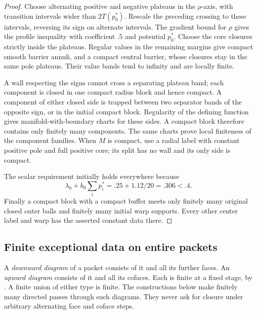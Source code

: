 \begin{proof}
Choose alternating positive and negative plateaus in the $\rho$-axis,
with transition intervals wider than $2T(p_0^*)$. Rescale the preceding
crossing to these intervals, reversing its sign on alternate intervals.
The gradient bound for $\rho$ gives the profile inequality with
coefficient $.5$ and potential $p_0^*$. Choose the core closures
strictly inside the plateaus. Regular values in the remaining margins
give compact smooth barrier annuli, and a compact central barrier,
whose closures stay in the same pole plateaus. Their value bands tend
to infinity and are locally finite.

A wall respecting the signs cannot cross a separating plateau band;
each component is closed in one compact radius block and hence compact.
A component of either closed side is trapped between two separator
bands of the opposite sign, or in the initial compact block.
Regularity of the defining function gives manifold-with-boundary
charts for these sides. A compact block therefore contains only
finitely many components. The same charts prove local finiteness of
the component families. When $M$ is compact, use a radial label with
constant positive pole and full positive core; its split has no wall
and its only side is compact.

The scalar requirement initially holds everywhere because
\[
 \lambda_0+b_0\sum_i p_i^*=.25+1.12/20=.306<.4.
\]
Finally a compact block with a compact buffer meets only finitely many
original closed outer balls and finitely many initial warp supports.
Every other center label and warp has the asserted constant data there.
\end{proof}

\subsection{Finite exceptional data on entire packets}

A \emph{downward diagram} of a packet consists of it and all its further
faces. An \emph{upward diagram} consists of it and all its cofaces.
Each is finite at a fixed stage, by . A finite union
of either type is finite. The constructions below make finitely many
directed passes through such diagrams. They never ask for closure
under arbitrary alternating face and coface steps.

